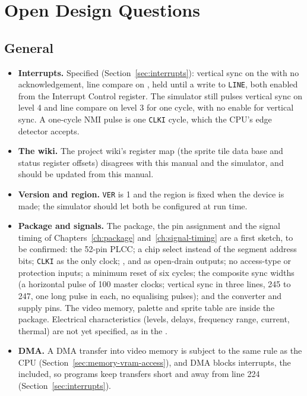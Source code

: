 \section{Open Design Questions}

\subsection{General}

\begin{itemize}
	\item \textbf{Interrupts.} Specified (Section~\ref{sec:interrupts}): vertical sync on the  with no
	      acknowledgement, line compare on , held until a write to \texttt{LINE}, both enabled from the Interrupt
	      Control register. The simulator still pulses vertical sync on level 4 and line compare on level 3 for one cycle,
	      with no enable for vertical sync. A one-cycle NMI pulse is one \texttt{CLKI} cycle, which the CPU's edge detector accepts.
	\item \textbf{The wiki.} The project wiki's register map (the sprite tile data base and status register offsets) disagrees with
	      this manual and the simulator, and should be updated from this manual.
	\item \textbf{Version and region.} \texttt{VER} is 1 and the region is fixed when the device is made; the simulator should
	      let both be configured at run time.
	\item \textbf{Package and signals.} The package, the pin assignment and the signal timing of Chapters~\ref{ch:package} and~\ref{ch:signal-timing}
	      are a first sketch, to be confirmed: the 52-pin PLCC; a chip select instead of the segment address bits; \texttt{CLKI} as
	      the only clock; ,  and  as open-drain outputs; no access-type or protection
	      inputs; a minimum reset of six cycles; the composite sync widths (a horizontal pulse of 100 master clocks; vertical sync
	      in three lines, 245 to 247, one long pulse in each, no equalising pulses); and the converter and supply pins. The video memory,
	      palette and sprite table are inside the package. Electrical characteristics (levels, delays, frequency range, current,
	      thermal) are not yet specified, as in the \hwmanual{}.
	\item \textbf{DMA.} A DMA transfer into video memory is subject to the same rule as the CPU
	      (Section~\ref{sec:memory-vram-access}), and DMA blocks interrupts, the  included, so programs keep
	      transfers short and away from line 224 (Section~\ref{sec:interrupts}).
\end{itemize}

